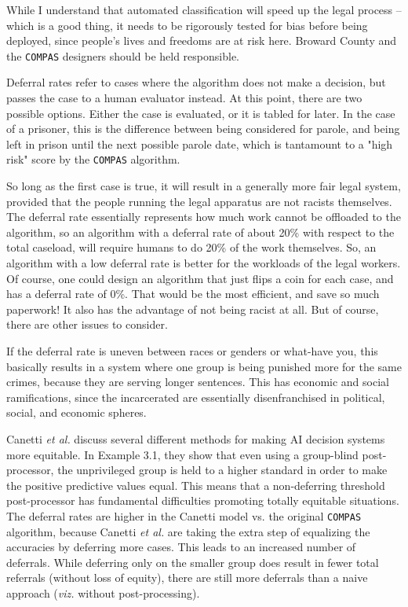 \documentclass[11pt,largemargins, anonymous]{homework}
\begin{document}
\begin{arabicparts}
    While I understand that automated classification will speed up the legal process -- which is a good thing,
    it needs to be rigorously tested for bias before being deployed,
    since people's lives and freedoms are at risk here.
    Broward County and the \texttt{COMPAS} designers should be held responsible.

    \questionpart

    Deferral rates refer to cases where the algorithm does not make a decision,
    but passes the case to a human evaluator instead.
    At this point, there are two possible options.
    Either the case is evaluated, or it is tabled for later.
    In the case of a prisoner, this is the difference between being considered for parole,
    and being left in prison until the next possible parole date,
    which is tantamount to a "high risk" score by the \texttt{COMPAS} algorithm.

    So long as the first case is true, it will result in a generally more fair legal system,
    provided that the people running the legal apparatus are not racists themselves.
    The deferral rate essentially represents how much work cannot be offloaded to the algorithm,
    so an algorithm with a deferral rate of about 20\% with respect to the total caseload,
    will require humans to do 20\% of the work themselves.
    So, an algorithm with a low deferral rate is better for the workloads of the legal workers.
    Of course, one could design an algorithm that just flips a coin for each case,
    and has a deferral rate of 0\%.
    That would be the most efficient, and save so much paperwork!
    It also has the advantage of not being racist at all.
    But of course, there are other issues to consider.

    If the deferral rate is uneven between races or genders or what-have you,
    this basically results in a system where one group is being punished more for the same crimes,
    because they are serving longer sentences.
    This has economic and social ramifications,
    since the incarcerated are essentially disenfranchised in political, social, and economic spheres.

    \questionpart

    Canetti \textit{et al.} discuss several different methods for making AI decision systems more equitable.
    In Example 3.1, they show that even using a group-blind post-processor,
    the unprivileged group is held to a higher standard in order to make the positive predictive values equal.
    This means that a non-deferring threshold post-processor has fundamental
    difficulties promoting totally equitable situations.
    The deferral rates are higher in the Canetti model vs. the original \texttt{COMPAS} algorithm,
    because Canetti \textit{et al.} are taking the extra step of equalizing the accuracies
    by deferring more cases.
    This leads to an increased number of deferrals.
    While deferring only on the smaller group does result in fewer total referrals (without loss of equity),
    there are still more deferrals than a naive approach (\textit{viz.} without post-processing).


\end{arabicparts}
\end{document}
